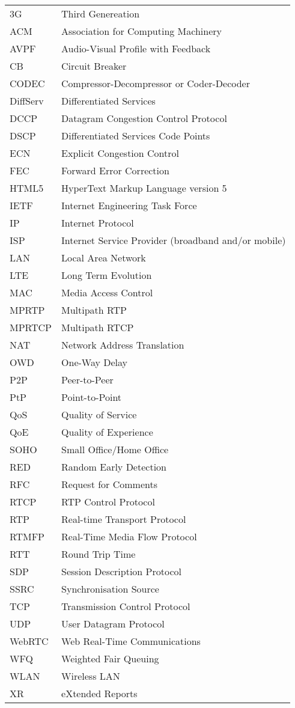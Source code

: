 \begin{longtable}{ll}
3G		& Third Genereation \\
ACM 	& Association for Computing Machinery \\
AVPF	& Audio-Visual Profile with Feedback \\
CB		& Circuit Breaker \\
CODEC	& Compressor-Decompressor or Coder-Decoder \\
DiffServ	& Differentiated Services \\
DCCP 	& Datagram Congestion Control Protocol \\
DSCP 	& Differentiated Services Code Points \\
ECN		& Explicit Congestion Control \\
FEC		& Forward Error Correction \\
HTML5	& HyperText Markup Language version 5\\
IETF	& Internet Engineering Task Force \\
IP		& Internet Protocol \\
ISP 	& Internet Service Provider (broadband and/or mobile)\\
LAN 	& Local Area Network \\
LTE 	& Long Term Evolution \\
MAC 	& Media Access Control \\
MPRTP 	& Multipath RTP \\
MPRTCP	& Multipath RTCP \\
NAT 	& Network Address Translation \\
OWD 	& One-Way Delay \\
P2P 	& Peer-to-Peer \\
PtP 	& Point-to-Point \\
QoS 	& Quality of Service \\
QoE 	& Quality of Experience \\
SOHO 	& Small Office/Home Office \\
RED 	& Random Early Detection \\
RFC 	& Request for Comments \\
RTCP 	& RTP Control Protocol \\
RTP 	& Real-time Transport Protocol \\
RTMFP	& Real-Time Media Flow Protocol \\
RTT 	& Round Trip Time \\
SDP 	& Session Description Protocol \\
SSRC	& Synchronisation Source \\
TCP 	& Transmission Control Protocol \\
UDP 	& User Datagram Protocol \\
WebRTC	& Web Real-Time Communications \\
WFQ 	& Weighted Fair Queuing \\
WLAN	& Wireless LAN \\
XR		& eXtended Reports \\
\end{longtable}
